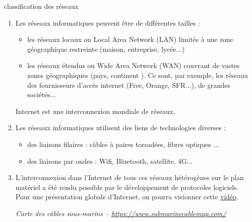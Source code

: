 \documentclass[a4paper,dvipsnames]{article}
\begin{document}
\begin{definition}[breakable]{classification des réseaux}{}
 \begin{enumerate}
   \item Les réseaux informatiques peuvent être de différentes tailles :
     \begin{itemize}
       \item les réseaux locaux ou {\color{red}Local Area Network (LAN)} limités à une zone géographique restreinte (maison, entreprise, lycée...)
     \item les réseaux étendus ou {\color{red}Wide Area Network (WAN)} couvrant de vastes zones géographiques (pays, continent ). Ce sont, par exemple, les réseaux des fournisseurs d'accès internet (Free, Orange, SFR...), de grandes sociétés...
     \end{itemize}
     Internet est une interconnexion mondiale de réseaux.
   \item Les réseaux informatiques utilisent des liens de technologies diverses :
     \begin{itemize}
       \item des {\color{red}liaisons filaires} : câbles à paires torsadées, fibres optiques ...
       \item des liaisons {\color{red}par ondes} : Wifi, Bluetooth, satellite, 4G...
     \end{itemize}
   \item L'interconnexion dans l'Internet de tous ces réseaux hétérogènes sur le plan matériel a été rendu possible par le développement de protocoles logiciels. Pour une présentation globale d'Internet, on pourra visionner cette \href{https://www.youtube.com/watch?v=dCknqcjcItU}{vidéo}.

     \begin{center}

       \smallskip

       \scriptsize\textit{Carte des câbles sous-marins -- \url{https://www.submarinecablemap.com/}}
     \end{center}

 \end{enumerate} 
\end{definition}
\end{document}
